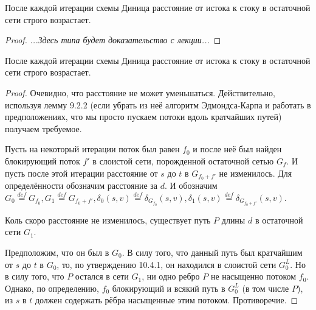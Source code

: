 \Lm После каждой итерации схемы Диница расстояние от истока к стоку в остаточной сети строго возрастает.
\begin{proof}

    \textit{...Здесь типа будет доказательство с лекции...}

\end{proof}

\Lm После каждой итерации схемы Диница расстояние от истока к стоку в остаточной сети строго возрастает.
\begin{proof}

    Очевидно, что расстояние не может уменьшаться. Действительно, используя лемму 9.2.2 (если убрать из неё алгоритм Эдмондса-Карпа и работать в предположениях, что мы просто пускаем потоки вдоль кратчайших путей) получаем требуемое.

    Пусть на некоторый итерации поток был равен $f_0$ и после неё был найден блокирующий поток $f'$ в слоистой сети, порожденной остаточной сетью $G_f$.
    И пусть после этой итерации расстояние от $s$ до $t$ в $G_{f_0 + f'}$ не изменилось. Для определённости обозначим расстояние за $d$. И обозначим $G_0 \overset{def}{=} G_{f_0}, G_1 \overset{def}{=} G_{f_0 + f'}, \delta_0(s, v) \overset{def}{=} \delta_{G_{f_0}}(s, v), \delta_1(s, v) \overset{def}{=} \delta_{G_{f_0 + f'}}(s, v)$.

    Коль скоро расстояние не изменилось, существует путь $P$ длины $d$ в остаточной сети $G_1$. 

    Предположим, что он был в $G_0$. В силу того, что данный путь был кратчайшим от $s$ до $t$ в $G_0$, то, по утверждению 10.4.1, он находился в слоистой сети $G^L_0$.
    Но в силу того, что $P$ остался в сети $G_1$, ни одно ребро $P$ не насыщенно потоком $f_0$. Однако, по определению, $f_0$ блокирующий и всякий путь в $G_0^L$ (в том числе $P$), из $s$ в $t$ должен содержать рёбра насыщенные этим потоком. Противоречие.


\end{proof}
